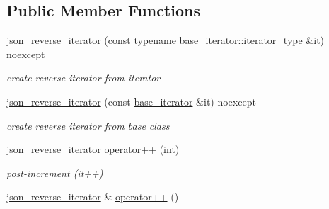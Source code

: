 \subsection*{Public Member Functions}
\begin{DoxyCompactItemize}
\item 
\hyperlink{classnlohmann_1_1basic__json_1_1json__reverse__iterator_a1270fe04d4801caf51e7464273305ba8}{json\+\_\+reverse\+\_\+iterator} (const typename base\+\_\+iterator\+::iterator\+\_\+type \&it) noexcept\hypertarget{classnlohmann_1_1basic__json_1_1json__reverse__iterator_a1270fe04d4801caf51e7464273305ba8}{}\label{classnlohmann_1_1basic__json_1_1json__reverse__iterator_a1270fe04d4801caf51e7464273305ba8}

\begin{DoxyCompactList}\small\item\em create reverse iterator from iterator \end{DoxyCompactList}\item 
\hyperlink{classnlohmann_1_1basic__json_1_1json__reverse__iterator_af04099cd32946ab37cfa6004ad5a7863}{json\+\_\+reverse\+\_\+iterator} (const \hyperlink{classnlohmann_1_1basic__json_1_1json__reverse__iterator_a5b7f3c5d86fe89a65d9552c1cac37261}{base\+\_\+iterator} \&it) noexcept\hypertarget{classnlohmann_1_1basic__json_1_1json__reverse__iterator_af04099cd32946ab37cfa6004ad5a7863}{}\label{classnlohmann_1_1basic__json_1_1json__reverse__iterator_af04099cd32946ab37cfa6004ad5a7863}

\begin{DoxyCompactList}\small\item\em create reverse iterator from base class \end{DoxyCompactList}\item 
\hyperlink{classnlohmann_1_1basic__json_1_1json__reverse__iterator}{json\+\_\+reverse\+\_\+iterator} \hyperlink{classnlohmann_1_1basic__json_1_1json__reverse__iterator_a060bdfaef94d3ca21dd6e7034980ea9c}{operator++} (int)\hypertarget{classnlohmann_1_1basic__json_1_1json__reverse__iterator_a060bdfaef94d3ca21dd6e7034980ea9c}{}\label{classnlohmann_1_1basic__json_1_1json__reverse__iterator_a060bdfaef94d3ca21dd6e7034980ea9c}

\begin{DoxyCompactList}\small\item\em post-\/increment (it++) \end{DoxyCompactList}\item 
\hyperlink{classnlohmann_1_1basic__json_1_1json__reverse__iterator}{json\+\_\+reverse\+\_\+iterator} \& \hyperlink{classnlohmann_1_1basic__json_1_1json__reverse__iterator_aa10b55b0c57a849cfe0cba15e7818e97}{operator++} ()\hypertarget{classnlohmann_1_1basic__json_1_1json__reverse__iterator_aa10b55b0c57a849cfe0cba15e7818e97}{}\label{classnlohmann_1_1basic__json_1_1json__reverse__iterator_aa10b55b0c57a849cfe0cba15e7818e97}


\end{DoxyCompactItemize}
